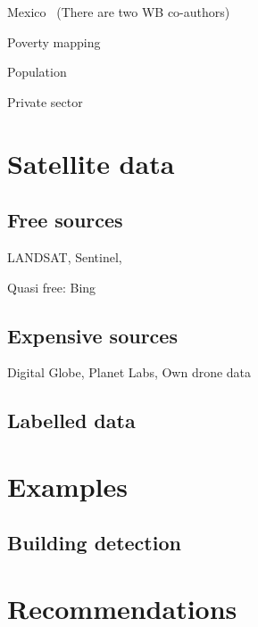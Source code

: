 \documentclass[12pt, a4paper, oneside, headinclude, footinclude]{article}
\begin{document}
Mexico~\cite{babenko2017poverty} (There are two WB co-authors)

Poverty mapping~\cite{Jean790}

Population~\cite{doupe2016, robinson2017}

Private sector~\cite{facebook, cnn_orbital}

\section{Satellite data}

\subsection{Free sources}

LANDSAT, Sentinel, 

Quasi free: Bing

\subsection{Expensive sources}

Digital Globe, Planet Labs, Own drone data

\subsection{Labelled data}

\section{Examples}

\subsection{Building detection}

\section{Recommendations}


\renewcommand{\refname}{\spacedlowsmallcaps{References}} 





\end{document}
